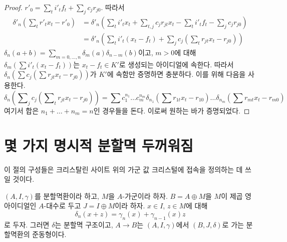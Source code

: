 \begin{proof}
$r'_0 = \sum_t i'_t f_t + \sum_j c_j r_{j0}$.
따라서
\begin{align*}
\delta'_n(\sum\nolimits_t r'_t x_t  - r'_0)
& =
\delta'_n(
\sum\nolimits_t i'_t x_t +
\sum\nolimits_{t, j} c_j r_{jt} x_t -
\sum\nolimits_t i'_t f_t -
\sum\nolimits_j c_j r_{j0}) \\
& =
\delta'_n(
\sum\nolimits_t i'_t(x_t - f_t) +
\sum\nolimits_j c_j (\sum\nolimits_t r_{jt} x_t  - r_{j0}))
\end{align*}
$\delta_n(a + b) = \sum_{m = 0, \ldots, n} \delta_m(a) \delta_{n - m}(b)$이고,
$m > 0$에 대해 $\delta_m(\sum i'_t(x_t - f_t))$는
$x_t - f_t \in K'$로 생성되는 아이디얼에 속한다. 따라서
$\delta_n(\sum c_j (\sum r_{jt} x_t  - r_{j0}))$가 $K'$에 속함만
증명하면 충분하다. 이를 위해 다음을 사용한다.
$$
\delta_n(\sum\nolimits_j c_j (\sum\nolimits_t r_{jt} x_t  - r_{j0}))
=
\sum c_1^{n_1} \ldots c_m^{n_m}
\delta_{n_1}(\sum r_{1t} x_t  - r_{10}) \ldots
\delta_{n_m}(\sum r_{mt} x_t  - r_{m0})
$$
여기서 합은 $n_1 + \ldots + n_m = n$인 경우들을 돈다.
이로써 원하는 바가 증명되었다.
\end{proof}





\section{몇 가지 명시적 분할멱 두꺼워짐}
\label{section-explicit-thickenings}

\noindent
이 절의 구성들은 크리스탈린 사이트 위의 가군 값 크리스털에 접속을
정의하는 데 쓰일 것이다.

\begin{lemma}
\label{lemma-divided-power-first-order-thickening}
$(A, I, \gamma)$를 분할멱환이라 하고, $M$을 $A$-가군이라 하자.
$B = A \oplus M$을 $M$이 제곱 영 아이디얼인 $A$-대수로 두고
$J = I \oplus M$이라 하자. $x \in I$, $z \in M$에 대해
$$
\delta_n(x + z) = \gamma_n(x) + \gamma_{n - 1}(x)z
$$
로 두자. 그러면 $\delta$는 분할멱 구조이고,
$A \to B$는 $(A, I, \gamma)$에서 $(B, J, \delta)$로 가는
분할멱환의 준동형이다.
\end{lemma}

